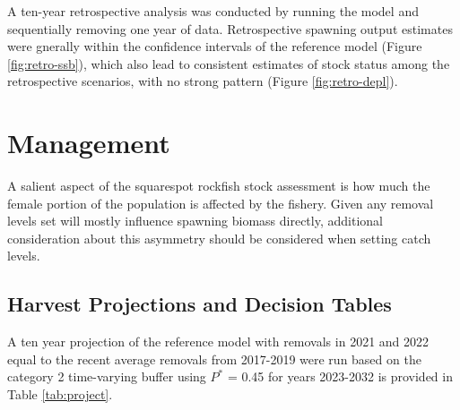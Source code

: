 \documentclass[11pt,
  english,
  a4paper,
]{article}
\begin{document}
\leavevmode\tagmcend\tagstructend


A ten-year retrospective analysis was conducted by running the model and sequentially removing one year of data. Retrospective spawning output estimates were gnerally within the confidence intervals of the reference model (Figure \ref{fig:retro-ssb}), which also lead to consistent estimates of stock status among the retrospective scenarios, with no strong pattern (Figure \ref{fig:retro-depl}).

\leavevmode\tagmcend\tagstructend\par


\hypertarget{management}{%
\section{Management}\label{management}}

\leavevmode\tagmcend\tagstructend


A salient aspect of the squarespot rockfish stock assessment is how much the female portion of the population is affected by the fishery. Given any removal levels set will mostly influence spawning biomass directly, additional consideration about this asymmetry should be considered when setting catch levels.

\leavevmode\tagmcend\tagstructend\par


\hypertarget{harvest-projections-and-decision-tables}{%
\subsection{Harvest Projections and Decision Tables}\label{harvest-projections-and-decision-tables}}

\leavevmode\tagmcend\tagstructend


A ten year projection of the reference model with removals in 2021 and 2022 equal to the recent average removals from 2017-2019 were run based on the category 2 time-varying buffer using {\(P^*\)\leavevmode\tagmcend\tagstructend} = 0.45 for years 2023-2032 is provided in Table \ref{tab:project}.
\end{document}
